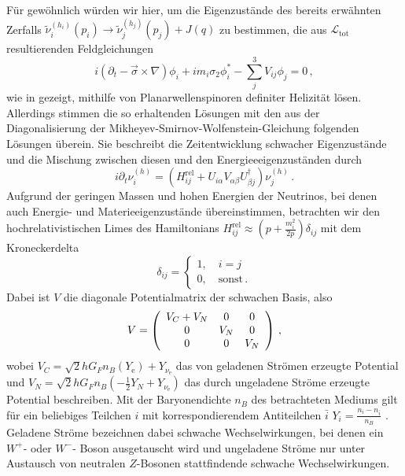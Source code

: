 Für gewöhnlich würden wir hier, um die Eigenzustände des bereits erwähnten Zerfalls $\tilde{\nu}^{(h_i)}_i (p_i) \rightarrow \tilde{\nu}^{(h_j)}_j (p_j) + J(q)$ zu bestimmen, 
die aus $\mathcal{L}_\text{tot}$ resultierenden Feldgleichungen 
\begin{equation}
    i \left(\partial_t - \vec{\sigma} \times \nabla \right) \phi_i + i m_i \sigma_2 \phi^*_i - \sum^3_j V_{i j} \phi_j = 0 \,,
\end{equation}
wie in \cite{komponentendinger} gezeigt, mithilfe von Planarwellenspinoren definiter Helizität lösen. 
Allerdings stimmen die so erhaltenden Lösungen mit den aus der Diagonalisierung der Mikheyev-Smirnov-Wolfenstein-Gleichung folgenden Lösungen überein.
Sie beschreibt die Zeitentwicklung schwacher Eigenzustände und die Mischung zwischen diesen und den Energieeeigenzuständen durch
\begin{equation}
    i \partial_t \nu^{(h)}_i = \left(H^\text{rel}_{i j} + U_{i \alpha} V_{\alpha \beta} U^\dagger_{\beta j}\right) \nu^{(h)}_j \,.
    \label{eq:MSW-gleichung}
\end{equation}
Aufgrund der geringen Massen und hohen Energien der Neutrinos, bei denen auch Energie- und Materieeigenzustände übereinstimmen, 
betrachten wir den hochrelativistischen Limes des Hamiltonians $H^\text{rel}_{i j} \approx \left(p + \frac{m^2_i}{2 p}\right) \delta_{ij}$ mit dem Kroneckerdelta
\begin{equation}
    \delta_{ij} = \begin{cases}
                    1, \quad i=j \\
                    0, \quad \text{sonst} \,.
                  \end{cases}
                  \label{eq:kronecker}
\end{equation}
Dabei ist $V$ die diagonale Potentialmatrix der schwachen Basis, also
\begin{equation}
    V = \left( \begin{array}{c c c}
        V_C + V_N   &   0     &     0   \\ 
        0           &   V_N   &     0   \\ 
        0           &   0     &     V_N  \\
        \end{array}\right) \,,
\end{equation}
wobei $V_C = \sqrt{2} h G_F n_B (Y_\text{e}) + Y_{\nu_\text{e}}$ das von geladenen Strömen erzeugte Potential und 
$V_N = \sqrt{2} h G_F n_B \left(-\frac{1}{2} Y_N + Y_{\nu_\text{e}}\right)$ das durch ungeladene Ströme erzeugte Potential beschreiben.
Mit der Baryonendichte $n_B$ des betrachteten Mediums gilt für ein beliebiges Teilchen $i$ mit korrespondierendem Antiteilchen $\bar{i}$ $Y_i = \frac{n_i - n_{\bar{i}}}{n_B}$ \cite{päspaper}.
Geladene Ströme bezeichnen dabei schwache Wechselwirkungen, bei denen ein $W^+$- oder $W^-$- Boson ausgetauscht wird und ungeladene Ströme nur unter Austausch von neutralen $Z$-Bosonen stattfindende schwache Wechselwirkungen.

